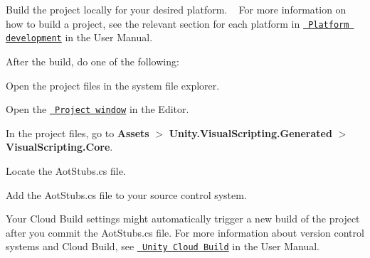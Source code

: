 \begin{DoxyEnumerate}
\item Build the project locally for your desired platform. ~\newline
For more information on how to build a project, see the relevant section for each platform in \href{https://docs.unity3d.com/Documentation/Manual/PlatformSpecific.html}{\texttt{ Platform development}} in the User Manual.
\item After the build, do one of the following\+:
\begin{DoxyItemize}
\item Open the project files in the system file explorer.
\item Open the \href{https://docs.unity3d.com/Manual/ProjectView.html}{\texttt{ Project window}} in the  Editor.
\end{DoxyItemize}
\item In the project files, go to {\bfseries{Assets}} \texorpdfstring{$>$}{>} {\bfseries{Unity.\+Visual\+Scripting.\+Generated}} \texorpdfstring{$>$}{>} {\bfseries{Visual\+Scripting.\+Core}}.
\item Locate the {\ttfamily Aot\+Stubs.\+cs} file.
\item Add the {\ttfamily Aot\+Stubs.\+cs} file to your source control system.
\end{DoxyEnumerate}

Your Cloud Build settings might automatically trigger a new build of the project after you commit the {\ttfamily Aot\+Stubs.\+cs} file. For more information about version control systems and Cloud Build, see \href{https://docs.unity3d.com/Manual/UnityCloudBuild.html}{\texttt{ Unity Cloud Build}} in the User Manual. 